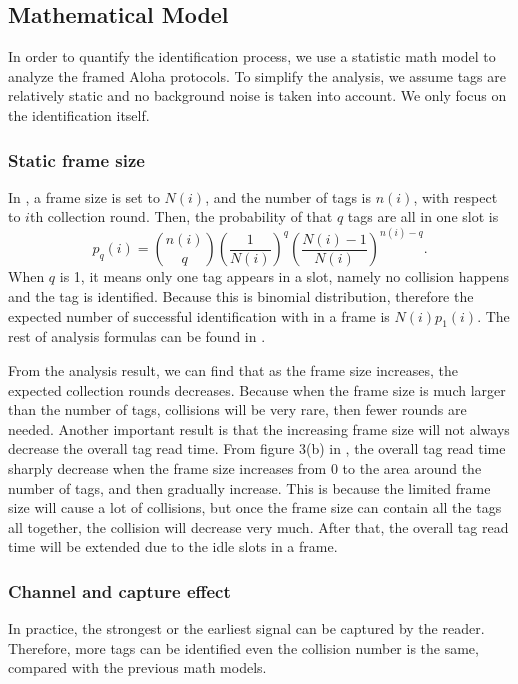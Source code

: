 \documentclass[12pt,letterpaper]{article}
\begin{document}
\subsection{Mathematical Model}
In order to quantify the identification process, we use a statistic math
model to analyze the framed Aloha protocols. To simplify the analysis,
we assume tags are relatively static and no background noise is taken
into account. We only focus on the identification itself.
\subsubsection{Static frame size}
In \cite{frame}, a frame size is set to $N(i)$, and the number of tags is
$n(i)$, with respect to $i$th collection round. Then, the probability of
that $q$ tags are all in one slot is
\begin{equation}
p_q(i) = {n(i) \choose q} \left(\frac{1}{N(i)}\right)^q 
\left(\frac{N(i) - 1}{N(i)} \right)^{n(i) - q}.
\end{equation}
When $q$ is 1, it means only one tag appears in a slot, namely no 
collision happens and the tag is identified. Because this is binomial
distribution, therefore the expected number of successful identification
with in a frame is $N(i)p_1(i)$. The rest of analysis formulas can be
found in \cite{frame}.

From the analysis result\cite{frame}, we can find that as the frame size
increases, the expected collection rounds decreases. Because when 
the frame size is much larger than the number of tags, collisions will
be very rare, then fewer rounds are needed. Another important result
is that the increasing frame size will not always decrease the overall
tag read time. From figure 3(b) in \cite{frame}, the overall tag read
time sharply decrease when the frame size increases from 0 to the
area around the number of tags, and then gradually increase. 
This is because the limited frame size will cause a lot of collisions, 
but once the frame size can contain all the tags all together, the collision
will decrease very much. After that, the overall tag read time will be
extended due to the idle slots in a frame.

\subsubsection{Channel and capture effect}
In practice, the strongest or the earliest signal can be captured by 
the reader. Therefore, more tags can be identified even the collision
number is the same, compared with the previous math models.
\end{document}
